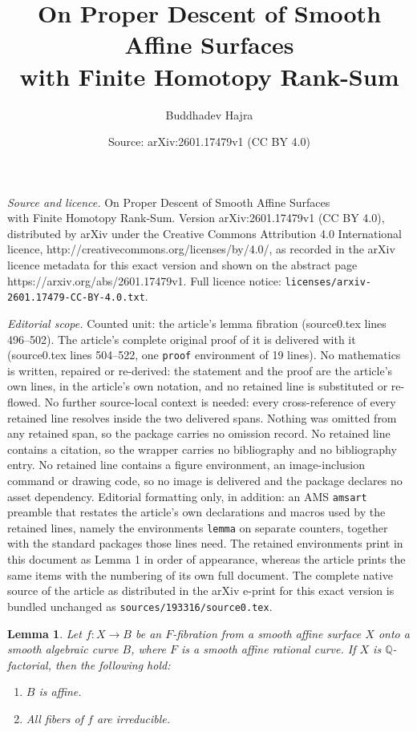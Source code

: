 \documentclass[10pt,a4paper]{amsart}
\title{On Proper Descent of Smooth Affine Surfaces\\with Finite Homotopy Rank-Sum}
\author{Buddhadev Hajra}
\date{Source: arXiv:2601.17479v1 (CC BY 4.0)}
\newtheorem{lemma}{Lemma}
\newcommand{\Q}{\mathbb{Q}}
\begin{document}
\maketitle

\noindent\emph{Source and licence.} On Proper Descent of Smooth Affine Surfaces\\with Finite Homotopy Rank-Sum. Version arXiv:2601.17479v1 (CC BY 4.0), distributed by arXiv under the Creative Commons Attribution 4.0 International licence, http://creativecommons.org/licenses/by/4.0/, as recorded in the arXiv licence metadata for this exact version and shown on the abstract page https://arxiv.org/abs/2601.17479v1. Full licence notice: \texttt{licenses/arxiv-2601.17479-CC-BY-4.0.txt}.\par\smallskip

\noindent\textit{Editorial scope.} Counted unit: the article's lemma fibration (source0.tex lines 496--502). The article's complete original proof of it is delivered with it (source0.tex lines 504--522, one \texttt{proof} environment of 19 lines). No mathematics is written, repaired or re-derived: the statement and the proof are the article's own lines, in the article's own notation, and no retained line is substituted or re-flowed.  No further source-local context is needed: every cross-reference of every retained line resolves inside the two delivered spans.  Nothing was omitted from any retained span, so the package carries no omission record.  No retained line contains a citation, so the wrapper carries no bibliography and no bibliography entry.  No retained line contains a figure environment, an image-inclusion command or drawing code, so no image is delivered and the package declares no asset dependency.  Editorial formatting only, in addition: an AMS \texttt{amsart} preamble that restates the article's own declarations and macros used by the retained lines, namely the environments \texttt{lemma} on separate counters, together with the standard packages those lines need.  The retained environments print in this document as Lemma 1 in order of appearance, whereas the article prints the same items with the numbering of its own full document.  The complete native source of the article as distributed in the arXiv e-print for this exact version is bundled unchanged as \texttt{sources/193316/source0.tex}.
\begin{lemma}\label{Lem: Q-factorial fibration}
Let $f: X \to B$ be an $F$-fibration from a smooth affine surface $X$ onto a smooth algebraic curve $B$, where $F$ is a smooth affine rational curve. If $X$ is $\Q$-factorial, then the following hold:
\begin{enumerate}[\indent\rm(1)]
    \item $B$ is affine.
    \item All fibers of $f$ are irreducible. 
\end{enumerate}
\end{lemma}
\end{document}
